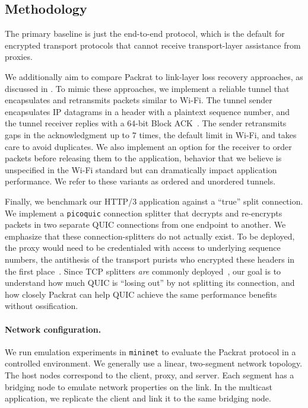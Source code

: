 \subsection{Methodology}

The primary baseline is just the end-to-end protocol, which is the default for
encrypted transport protocols that cannot receive transport-layer assistance
from proxies.

We additionally aim to compare Packrat to link-layer loss recovery approaches,
as discussed in .
To mimic these approaches,
we implement a reliable tunnel that
encapsulates and retransmits packets
similar to Wi-Fi. The tunnel sender encapsulates IP datagrams in a header with
a plaintext sequence number, and the tunnel receiver replies with a 64-bit
Block ACK~\cite{ieee80211e}. The sender retransmits gaps in the acknowledgment up
to $7$ times, the default limit in Wi-Fi, and takes care to avoid duplicates. We
also implement an option for the receiver to order packets before releasing
them to the application, behavior that we believe is unspecified in the Wi-Fi
standard but can dramatically impact application performance.
We refer to these variants as ordered and unordered tunnels.

Finally, we benchmark our HTTP/3 application against a ``true'' split
connection. We implement a \texttt{picoquic} connection splitter that decrypts
and re-encrypts packets in two separate QUIC connections from one endpoint to
another. We emphasize that these connection-splitters do not actually exist. To
be deployed, the proxy would need to be credentialed with access to underlying
sequence numbers, the antithesis of the transport purists who encrypted these
headers in the first place~\cite{duke2023rfc}. Since TCP splitters \textit
{are} commonly deployed~\cite{honda2011still,rfc3135}, our goal is to
understand how much QUIC is ``losing out'' by not splitting its connection, and
how closely Packrat can help QUIC achieve the same performance benefits without
ossification.


\paragraph{Network configuration.}

We run emulation experiments in \texttt{mininet} to evaluate the Packrat protocol
in a controlled environment. We generally use a linear, two-segment network
topology.
The host nodes
correspond to the client, proxy, and server. Each segment has a bridging
node to emulate network properties on the link. In the multicast application,
we replicate the client and link it to the same bridging node.


